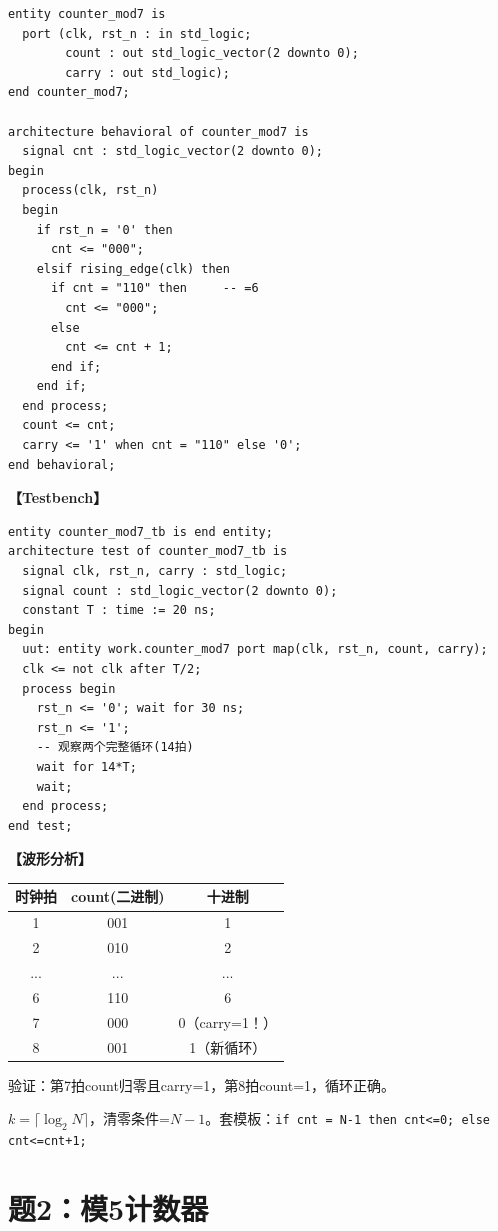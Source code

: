 \begin{solution}[完整解答]
\begin{lstlisting}
entity counter_mod7 is
  port (clk, rst_n : in std_logic;
        count : out std_logic_vector(2 downto 0);
        carry : out std_logic);
end counter_mod7;

architecture behavioral of counter_mod7 is
  signal cnt : std_logic_vector(2 downto 0);
begin
  process(clk, rst_n)
  begin
    if rst_n = '0' then
      cnt <= "000";
    elsif rising_edge(clk) then
      if cnt = "110" then     -- =6
        cnt <= "000";
      else
        cnt <= cnt + 1;
      end if;
    end if;
  end process;
  count <= cnt;
  carry <= '1' when cnt = "110" else '0';
end behavioral;
\end{lstlisting}

\textbf{【Testbench】}
\begin{lstlisting}
entity counter_mod7_tb is end entity;
architecture test of counter_mod7_tb is
  signal clk, rst_n, carry : std_logic;
  signal count : std_logic_vector(2 downto 0);
  constant T : time := 20 ns;
begin
  uut: entity work.counter_mod7 port map(clk, rst_n, count, carry);
  clk <= not clk after T/2;
  process begin
    rst_n <= '0'; wait for 30 ns;
    rst_n <= '1';
    -- 观察两个完整循环(14拍)
    wait for 14*T;
    wait;
  end process;
end test;
\end{lstlisting}

\textbf{【波形分析】}
\begin{center}
\begin{tabular}{|c|c|c|}
\hline 时钟拍 & count(二进制) & 十进制 \\ \hline
1 & 001 & 1 \\ \hline
2 & 010 & 2 \\ \hline
...&...&...\\ \hline
6 & 110 & 6 \\ \hline
7 & 000 & 0（carry=1！）\\ \hline
8 & 001 & 1（新循环）\\ \hline
\end{tabular}
\end{center}
验证：第7拍count归零且carry=1，第8拍count=1，循环正确。

\end{solution}

\begin{quickkill}
$k=\lceil\log_2 N\rceil$，清零条件=$N{-}1$。套模板：\texttt{if cnt = N-1 then cnt<=0; else cnt<=cnt+1;}
\end{quickkill}


\section{题2：模5计数器}

